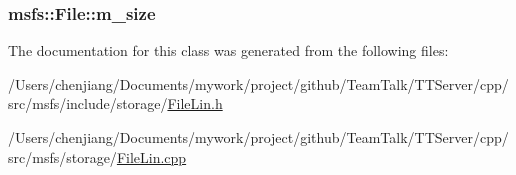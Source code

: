\subsubsection[{m\+\_\+size}]{ msfs\+::\+File\+::m\+\_\+size\hspace{0.3cm}{\ttfamily [private]}}\label{classmsfs_1_1_file_a736477e6c7c03b9d0a1ceaeb8b9c94c5}


The documentation for this class was generated from the following files\+:\begin{DoxyCompactItemize}
\item 
/\+Users/chenjiang/\+Documents/mywork/project/github/\+Team\+Talk/\+T\+T\+Server/cpp/src/msfs/include/storage/\hyperlink{_file_lin_8h}{File\+Lin.\+h}\item 
/\+Users/chenjiang/\+Documents/mywork/project/github/\+Team\+Talk/\+T\+T\+Server/cpp/src/msfs/storage/\hyperlink{_file_lin_8cpp}{File\+Lin.\+cpp}\end{DoxyCompactItemize}
